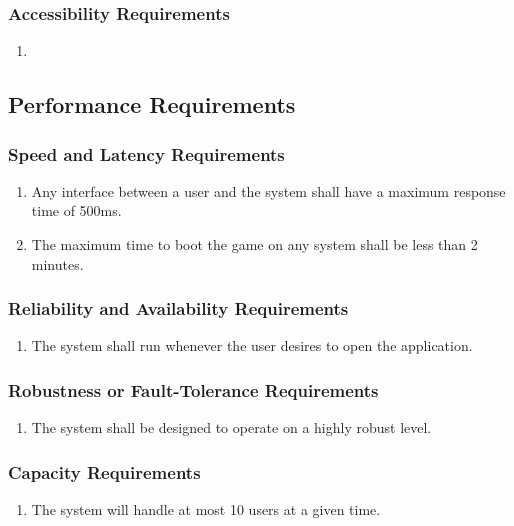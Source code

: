 \documentclass[12pt, titlepage]{article}
\begin{document}
        \subsubsection{Accessibility Requirements}
        \label{ssub:accessibility_requirements}
        \begin{enumerate}[label=UH\arabic*.]
        	\item 
        \end{enumerate}

\subsection{Performance Requirements}
    \subsubsection{Speed and Latency Requirements}
    \begin{enumerate}[label=PR\arabic*.]
        \item Any interface between a user and the system shall have a maximum response time of 500ms.
    	\item The maximum time to boot the game on any system shall be less than 2 minutes.
    \end{enumerate}
    \subsubsection{Reliability and Availability Requirements}
    \begin{enumerate}[label=PR\arabic*.]
    	\item The system shall run whenever the user desires to open the application.  
    \end{enumerate}
    \subsubsection{Robustness or Fault-Tolerance Requirements}
    \begin{enumerate}[label=PR\arabic*.]
    	\item The system shall be designed to operate on a highly robust level.
    \end{enumerate}
    \subsubsection{Capacity Requirements}
    \begin{enumerate}[label=PR\arabic*.]
    	\item The system will handle at most 10 users at a given time.
    \end{enumerate}
\end{document}
